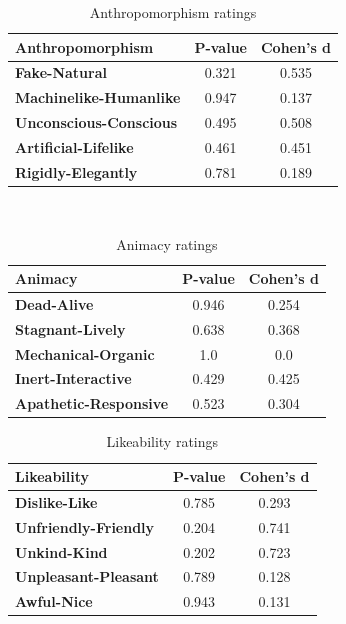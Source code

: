 \documentclass[conference]{IEEEtran}
\begin{document}
    \begin{table}[htbp]
        \centering
        \begin{tabular}{|l|c|c|}
        \hline
        \textbf{Anthropomorphism} & \textbf{P-value} & \textbf{Cohen's d} \\
        \hline
        \textbf{Fake-Natural} & 0.321 & 0.535 \\
        \hline
        \textbf{Machinelike-Humanlike} & 0.947 & 0.137 \\
        \hline
        \textbf{Unconscious-Conscious} & 0.495 & 0.508 \\
        \hline
        \textbf{Artificial-Lifelike} & 0.461 & 0.451 \\
        \hline
        \textbf{Rigidly-Elegantly} & 0.781 & 0.189 \\
        \hline
        \end{tabular}\\
        \vspace{5pt}
        \caption{Anthropomorphism ratings}
        \label{tab:anthropomorphism}
    \end{table}

    \begin{table}[htbp]
        \centering
        \begin{tabular}{|l|c|c|}
        \hline
        \textbf{Animacy} & \textbf{P-value} & \textbf{Cohen's d} \\
        \hline
        \textbf{Dead-Alive} & 0.946 & 0.254 \\
        \hline
        \textbf{Stagnant-Lively} & 0.638 & 0.368 \\
        \hline
        \textbf{Mechanical-Organic} & 1.0 & 0.0 \\
        \hline
        \textbf{Inert-Interactive} & 0.429 & 0.425 \\
        \hline
        \textbf{Apathetic-Responsive} & 0.523 & 0.304 \\
        \hline
        \end{tabular}
        \vspace{5pt}
        \caption{Animacy ratings}
        \label{tab:animacy}
    \end{table}
    
\begin{table}[htbp]
\centering
\begin{tabular}{|l|c|c|}
\hline
\textbf{Likeability} & \textbf{P-value} & \textbf{Cohen's d} \\
\hline
\textbf{Dislike-Like} & 0.785 & 0.293 \\
\hline
\textbf{Unfriendly-Friendly} & 0.204 & 0.741 \\
\hline
\textbf{Unkind-Kind} & 0.202 & 0.723 \\
\hline
\textbf{Unpleasant-Pleasant} & 0.789 & 0.128 \\
\hline
\textbf{Awful-Nice} & 0.943 & 0.131 \\
\hline
\end{tabular}
\vspace{5pt}
\caption{Likeability ratings}
\label{tab:likeability}
\end{table}
\end{document}
